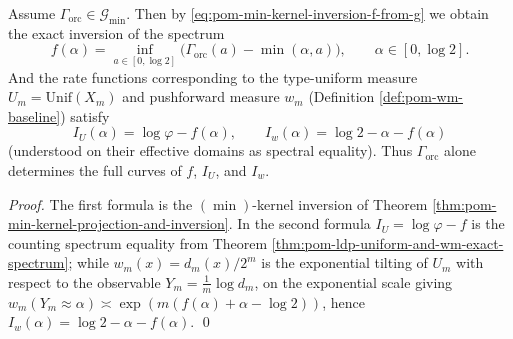\begin{theorem}\label{thm:pom-oracle-tomography-completeness-f-Iu-Iw}
Assume \(\Gamma_{\mathrm{orc}}\in\mathcal{G}_{\min}\).
Then by \eqref{eq:pom-min-kernel-inversion-f-from-g} we obtain the exact inversion of the spectrum
\[
\boxed{\;
f(\alpha)=\inf_{a\in[0,\log 2]}\bigl(\Gamma_{\mathrm{orc}}(a)-\min(\alpha,a)\bigr),\qquad \alpha\in[0,\log 2].\;}
\]
And the rate functions corresponding to the type-uniform measure \(U_m=\mathrm{Unif}(X_m)\) and pushforward measure \(w_m\) (Definition \ref{def:pom-wm-baseline}) satisfy
\[
\boxed{\;
I_U(\alpha)=\log\varphi-f(\alpha),\qquad
I_w(\alpha)=\log 2-\alpha-f(\alpha)\;}
\]
(understood on their effective domains as spectral equality).
Thus \(\Gamma_{\mathrm{orc}}\) alone determines the full curves of \(f\), \(I_U\), and \(I_w\).
\end{theorem}
\begin{proof}
The first formula is the \((\min)\)-kernel inversion of Theorem \ref{thm:pom-min-kernel-projection-and-inversion}.
In the second formula \(I_U=\log\varphi-f\) is the counting spectrum equality from Theorem \ref{thm:pom-ldp-uniform-and-wm-exact-spectrum};
while \(w_m(x)=d_m(x)/2^m\) is the exponential tilting of \(U_m\) with respect to the observable \(Y_m=\frac1m\log d_m\),
on the exponential scale giving
\(
w_m(Y_m\approx\alpha)\asymp \exp(m(f(\alpha)+\alpha-\log 2))
\),
hence \(I_w(\alpha)=\log 2-\alpha-f(\alpha)\). \qed
\end{proof}

